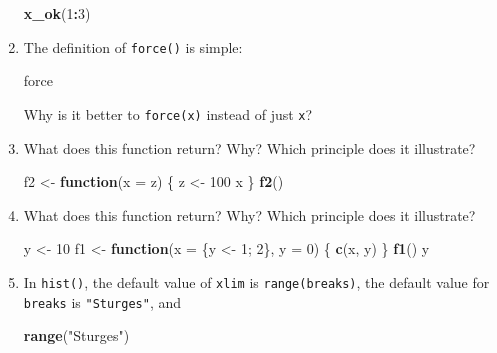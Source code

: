 \documentclass[]{book}
\newenvironment{Shaded}{\begin{snugshade}}{\end{snugshade}}
\newcommand{\KeywordTok}[1]{\textcolor[rgb]{0.13,0.29,0.53}{\textbf{#1}}}
\newcommand{\DataTypeTok}[1]{\textcolor[rgb]{0.13,0.29,0.53}{#1}}
\newcommand{\DecValTok}[1]{\textcolor[rgb]{0.00,0.00,0.81}{#1}}
\newcommand{\StringTok}[1]{\textcolor[rgb]{0.31,0.60,0.02}{#1}}
\newcommand{\ControlFlowTok}[1]{\textcolor[rgb]{0.13,0.29,0.53}{\textbf{#1}}}
\newcommand{\OperatorTok}[1]{\textcolor[rgb]{0.81,0.36,0.00}{\textbf{#1}}}
\newcommand{\NormalTok}[1]{#1}
\theoremstyle{definition}
\theoremstyle{definition}
\theoremstyle{definition}
\theoremstyle{remark}
\begin{document}
\begin{enumerate}
\begin{Shaded}
\begin{Highlighting}[]
\KeywordTok{x_ok}\NormalTok{(}\DecValTok{1}\OperatorTok{:}\DecValTok{3}\NormalTok{)}
\end{Highlighting}
\end{Shaded}
\item
  The definition of \texttt{force()} is simple:

\begin{Shaded}
\begin{Highlighting}[]
\NormalTok{force}
\end{Highlighting}
\end{Shaded}

  Why is it better to \texttt{force(x)} instead of just \texttt{x}?
\item
  What does this function return? Why? Which principle does it
  illustrate?

\begin{Shaded}
\begin{Highlighting}[]
\NormalTok{f2 <-}\StringTok{ }\ControlFlowTok{function}\NormalTok{(}\DataTypeTok{x =}\NormalTok{ z) \{}
\NormalTok{  z <-}\StringTok{ }\DecValTok{100}
\NormalTok{  x}
\NormalTok{\}}
\KeywordTok{f2}\NormalTok{()}
\end{Highlighting}
\end{Shaded}
\item
  What does this function return? Why? Which principle does it
  illustrate?

\begin{Shaded}
\begin{Highlighting}[]
\NormalTok{y <-}\StringTok{ }\DecValTok{10}
\NormalTok{f1 <-}\StringTok{ }\ControlFlowTok{function}\NormalTok{(}\DataTypeTok{x =}\NormalTok{ \{y <-}\StringTok{ }\DecValTok{1}\NormalTok{; }\DecValTok{2}\NormalTok{\}, }\DataTypeTok{y =} \DecValTok{0}\NormalTok{) \{}
  \KeywordTok{c}\NormalTok{(x, y)}
\NormalTok{\}}
\KeywordTok{f1}\NormalTok{()}
\NormalTok{y}
\end{Highlighting}
\end{Shaded}
\item
  In \texttt{hist()}, the default value of \texttt{xlim} is
  \texttt{range(breaks)}, the default value for \texttt{breaks} is
  \texttt{"Sturges"}, and

\begin{Shaded}
\begin{Highlighting}[]
\KeywordTok{range}\NormalTok{(}\StringTok{"Sturges"}\NormalTok{)}
\end{Highlighting}
\end{Shaded}


\end{enumerate}
\end{document}
